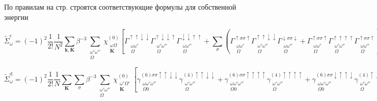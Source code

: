 \documentclass[11pt,a4paper]{report}
\begin{document}
\vspace{1cm}

По правилам на стр.\pageref{rules} строятся соответствующие формулы для собственной энергии

\begin{equation}
 \tilde{\Sigma}^\text{c}_\omega = (-1)^2 \frac{1}{2!} \frac{1}{N^2} \sum_{\mathbf{k,K}} \beta^{-3}  \sum_{\substack{\omega'\omega''\\\Omega}} \chi_{\substack{\omega\Omega\\\mathbf{K}}}^{(0)}
 \left[
 \Gamma^{\uparrow\uparrow\downarrow\downarrow}_{\substack{\omega\omega'\\\Omega}}  \Gamma^{\uparrow\downarrow\downarrow\uparrow}_{\substack{\omega'\omega''\\\Omega}}  \Gamma^{\downarrow\downarrow\uparrow\uparrow}_{\substack{\omega\omega''\\\Omega}}
 + \sum_{\sigma} \left(
 \Gamma^{\uparrow\sigma\sigma\uparrow}_{\substack{\omega\omega'\\\Omega}}  \Gamma^{\uparrow\uparrow\downarrow\downarrow}_{\substack{\omega'\omega''\\\Omega}}  \Gamma^{\downarrow\sigma\sigma\downarrow}_{\substack{\omega\omega''\\\Omega}}+
 \Gamma^{\uparrow\sigma\sigma\uparrow}_{\substack{\omega\omega'\\\Omega}}  \Gamma^{\uparrow\uparrow\uparrow\uparrow}_{\substack{\omega'\omega''\\\Omega}}  \Gamma^{\uparrow\sigma\sigma\uparrow}_{\substack{\omega\omega''\\\Omega}}
 \right)
 \right]_\mathbf{K}
 \chi_{\substack{\omega''\Omega\\\mathbf{K}}}^{(0)}  G_{\substack{\omega+\Omega\\\mathbf{k+K}}}
\end{equation}

\begin{equation}
 \tilde{\Sigma}^\text{d}_\omega = (-1)^2 \frac{1}{2!} \frac{1}{N} \sum_{\mathbf{K}} \sum_{\sigma} \beta^{-3} \sum_{\substack{\omega'\omega''\\\Omega}}
 \chi_{\substack{\omega'\Omega'\\\mathbf{K}}}^{(0)} \left[
  \gamma^{(6)\sigma\sigma\uparrow\uparrow\downarrow\downarrow}_{\substack{\omega\omega'\omega''\\\Omega 0}} \gamma^{(4)\uparrow\uparrow\downarrow\downarrow}_{\substack{\omega'\omega''\\\Omega}} +
  \gamma^{(6)\sigma\sigma\uparrow\uparrow\uparrow\uparrow}_{\substack{\omega\omega'\omega''\\\Omega 0}}\gamma^{(4)\uparrow\uparrow\uparrow\uparrow}_{\substack{\omega'\omega''\\\Omega}} +
  \gamma^{(6)\sigma\sigma\downarrow\uparrow\uparrow\downarrow}_{\substack{\omega\omega'\omega''\\\Omega 0}} \gamma^{(4)\uparrow\downarrow\downarrow\uparrow}_{\substack{\omega'\omega''\\\Omega}} 
  \right]_\mathbf{K}
  \chi_{\substack{\omega''\Omega\\\mathbf{K}}}^{(0)}
\end{equation}
\end{document}
